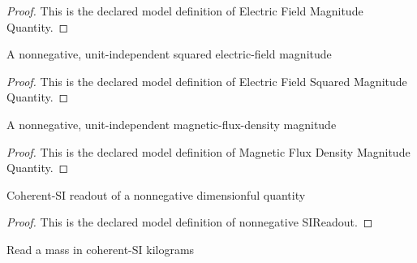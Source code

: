 \begin{proof}
  This is the declared model definition of Electric Field Magnitude Quantity.
\end{proof}
\begin{definition}
  \label{def:physics:phyx-mini-0955:phyxminiproblems-problemphyxmini0955-electricfieldsquaredmagnitudequantity}
  A nonnegative, unit-independent squared electric-field magnitude
\end{definition}
\begin{proof}
  This is the declared model definition of Electric Field Squared Magnitude Quantity.
\end{proof}
\begin{definition}
  \label{def:physics:phyx-mini-0955:phyxminiproblems-problemphyxmini0955-magneticfluxdensitymagnitudequantity}
  A nonnegative, unit-independent magnetic-flux-density magnitude
\end{definition}
\begin{proof}
  This is the declared model definition of Magnetic Flux Density Magnitude Quantity.
\end{proof}
\begin{definition}
  \label{def:physics:phyx-mini-0955:phyxminiproblems-problemphyxmini0955-nonnegativesireadout}
  Coherent-SI readout of a nonnegative dimensionful quantity
\end{definition}
\begin{proof}
  This is the declared model definition of nonnegative SIReadout.
\end{proof}
\begin{definition}
  \label{def:physics:phyx-mini-0955:phyxminiproblems-problemphyxmini0955-massinkilograms}
  Read a mass in coherent-SI kilograms
\end{definition}
